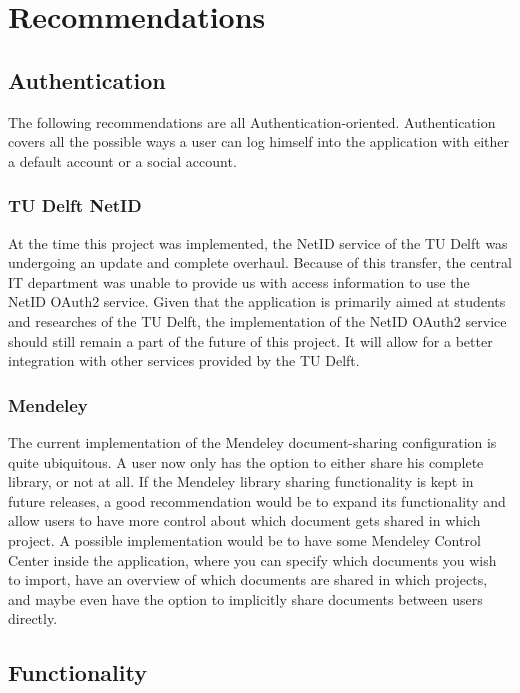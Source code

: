 \chapter{Recommendations}

\section{Authentication}

The following recommendations are all Authentication-oriented. Authentication covers all the possible ways a user can log
himself into the application with either a default account or a social account.

\subsection{TU Delft NetID}

At the time this project was implemented, the NetID service of the TU Delft was undergoing an update and complete overhaul. 
Because of this transfer, the central IT department was unable to provide us with access information to use the NetID OAuth2 service.
Given that the application is primarily aimed at students and researches of the TU Delft, the implementation of the NetID
OAuth2 service should still remain a part of the future of this project. It will allow for a better integration with other
services provided by the TU Delft.

\subsection{Mendeley}

The current implementation of the Mendeley document-sharing configuration is quite ubiquitous. A user now only has the option
to either share his complete library, or not at all. If the Mendeley library sharing functionality is kept in future releases,
a good recommendation would be to expand its functionality and allow users to have more control about which document gets shared
in which project. A possible implementation would be to have some Mendeley Control Center inside the application, where you
can specify which documents you wish to import, have an overview of which documents are shared in which projects, and maybe
even have the option to implicitly share documents between users directly.

\section{Functionality}


